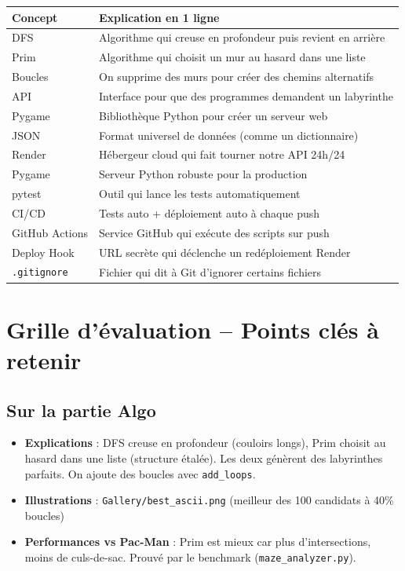 \documentclass[12pt,a4paper]{article}
\begin{document}
\begin{center}
\begin{tabular}{ll}
\toprule
\textbf{Concept} & \textbf{Explication en 1 ligne} \\
\midrule
DFS & Algorithme qui creuse en profondeur puis revient en arrière \\
Prim & Algorithme qui choisit un mur au hasard dans une liste \\
Boucles & On supprime des murs pour créer des chemins alternatifs \\
API & Interface pour que des programmes demandent un labyrinthe \\
Pygame & Bibliothèque Python pour créer un serveur web \\
JSON & Format universel de données (comme un dictionnaire) \\
Render & Hébergeur cloud qui fait tourner notre API 24h/24 \\
Pygame & Serveur Python robuste pour la production \\
pytest & Outil qui lance les tests automatiquement \\
CI/CD & Tests auto + déploiement auto à chaque push \\
GitHub Actions & Service GitHub qui exécute des scripts sur push \\
Deploy Hook & URL secrète qui déclenche un redéploiement Render \\
\texttt{.gitignore} & Fichier qui dit à Git d'ignorer certains fichiers \\
\bottomrule
\end{tabular}
\end{center}

\section{Grille d'évaluation -- Points clés à retenir}

\subsection{Sur la partie Algo}
\begin{itemize}
    \item \textbf{Explications} : DFS creuse en profondeur (couloirs longs), Prim choisit au hasard dans une liste (structure étalée). Les deux génèrent des labyrinthes parfaits. On ajoute des boucles avec \texttt{add\_loops}.
    \item \textbf{Illustrations} : \texttt{Gallery/best\_ascii.png} (meilleur des 100 candidats à 40\% boucles)
    \item \textbf{Performances vs Pac-Man} : Prim est mieux car plus d'intersections, moins de culs-de-sac. Prouvé par le benchmark (\texttt{maze\_analyzer.py}).
\end{itemize}
\end{document}
